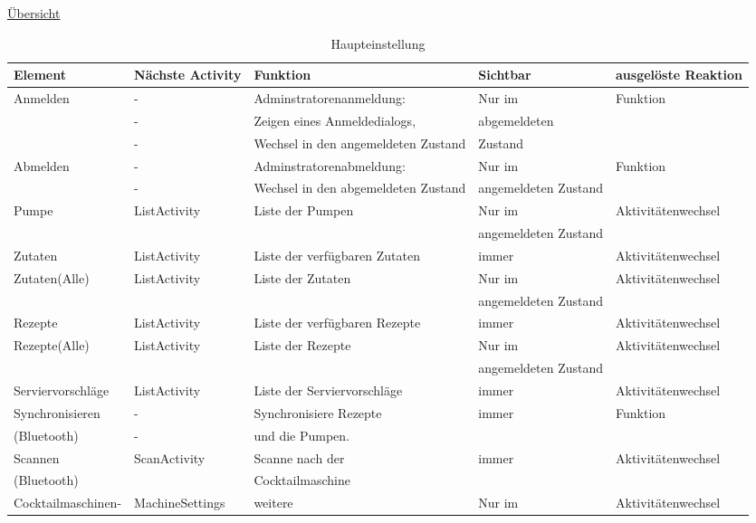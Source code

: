 \hyperref[table:main]{Übersicht}
\begin{table}
	\centering
	\caption{Haupteinstellung}
	\label{table:main}
	\begin{tabular}{|l|l|l|l|l|}
		\hline
		\textbf{Element } & \textbf{Nächste Activity } & \textbf{Funktion } & \textbf{Sichtbar } & \textbf{ausgelöste Reaktion} \\ \hline
		Anmelden  & -  & Adminstratorenanmeldung:   & Nur im   & Funktion \\
		
		  & -  &  Zeigen eines Anmeldedialogs,   & abgemeldeten   &  \\ 
		  & -  &   Wechsel in den angemeldeten Zustand  & Zustand  &  \\ 
		 \hline
		Abmelden  & -  & Adminstratorenabmeldung:  & Nur im    & Funktion \\ 
		  & -  &  Wechsel in den abgemeldeten Zustand  & angemeldeten Zustand  &  \\ 
		  \hline
		Pumpe  & ListActivity  & Liste der Pumpen  & Nur im   & Aktivitätenwechsel \\   &   &  &  angemeldeten Zustand  &  \\ \hline
		Zutaten  & ListActivity  & Liste der verfügbaren Zutaten  & immer  & Aktivitätenwechsel \\ \hline
		Zutaten(Alle)  & ListActivity  & Liste der Zutaten  & Nur im  & Aktivitätenwechsel \\
		   &   &  &  angemeldeten Zustand  &  \\  \hline
		Rezepte  & ListActivity  & Liste der verfügbaren Rezepte  & immer  & Aktivitätenwechsel \\ \hline
		Rezepte(Alle)  & ListActivity  & Liste der Rezepte  & Nur im  & Aktivitätenwechsel \\ 
		   &   &  &  angemeldeten Zustand  &  \\ \hline
		Serviervorschläge  & ListActivity  & Liste der Serviervorschläge  & immer  & Aktivitätenwechsel \\ \hline
		Synchronisieren   & -  & Synchronisiere Rezepte  & immer  & Funktion \\ 
		 (Bluetooth)  & -  & und die Pumpen.  &   &  \\ \hline
		Scannen   & ScanActivity  & Scanne nach der   & immer  & Aktivitätenwechsel \\
		 (Bluetooth)  &   & Cocktailmaschine  &    &   \\ \hline
		Cocktailmaschinen-  & MachineSettings  & weitere   &  Nur im  & Aktivitätenwechsel \\

\end{tabular}
\end{table}
